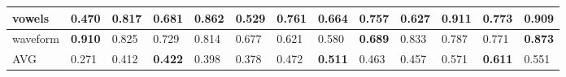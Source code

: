 \begin{table}[]
{\begin{tabular}{|l|llll|llllllll|}
vowels            & \multicolumn{1}{l|}{0.470}          & \multicolumn{1}{l|}{0.817}          & \multicolumn{1}{l|}{0.681}          & \textbf{0.862} & \multicolumn{1}{l|}{0.529}          & \multicolumn{1}{l|}{\textbf{0.761}} & \multicolumn{1}{l|}{0.664}          & \multicolumn{1}{l|}{0.757}          & \multicolumn{1}{l|}{0.627}  & \multicolumn{1}{l|}{\textbf{0.911}} & \multicolumn{1}{l|}{0.773}          & 0.909          \\ \hline
waveform          & \multicolumn{1}{l|}{\textbf{0.910}} & \multicolumn{1}{l|}{0.825}          & \multicolumn{1}{l|}{0.729}          & 0.814          & \multicolumn{1}{l|}{0.677}          & \multicolumn{1}{l|}{0.621}          & \multicolumn{1}{l|}{0.580}          & \multicolumn{1}{l|}{\textbf{0.689}} & \multicolumn{1}{l|}{0.833}  & \multicolumn{1}{l|}{0.787}          & \multicolumn{1}{l|}{0.771}          & \textbf{0.873} \\ \hline
AVG         & \multicolumn{1}{l|}{0.271}  & \multicolumn{1}{l|}{0.412}  & \multicolumn{1}{l|}{\textbf{0.422}} & 0.398 & \multicolumn{1}{l|}{0.378}  & \multicolumn{1}{l|}{0.472} & \multicolumn{1}{l|}{\textbf{0.511}} & \multicolumn{1}{l|}{0.463} & \multicolumn{1}{l|}{0.457}  & \multicolumn{1}{l|}{0.571} & \multicolumn{1}{l|}{\textbf{0.611}} & 0.551 \\ \hline


\end{tabular}%
}
\end{table}

